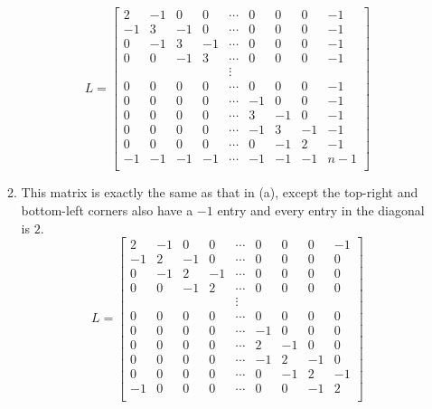 \documentclass[12pt]{article}
\begin{document}
\begin{enumerate}[label=(\alph*)]
\begin{enumerate}[label=(\alph*)]
        \[
          L = \begin{bmatrix}
            2 & -1 & 0 & 0 & \cdots & 0 & 0 & 0 & -1 \\
            -1 & 3 & -1 & 0 & \cdots & 0 & 0 & 0 & -1 \\
            0 & -1 & 3 & -1 & \cdots & 0 & 0 & 0 & -1 \\
            0 & 0 & -1 & 3 & \cdots & 0 & 0 & 0 & -1 \\
              &   &   &   & \vdots &   &   &   &   \\
            0 & 0 & 0 & 0 & \cdots & 0 & 0 & 0 & -1  \\
            0 & 0 & 0 & 0 & \cdots & -1 & 0 & 0 & -1  \\
            0 & 0 & 0 & 0 & \cdots & 3 & -1 & 0 & -1  \\
            0 & 0 & 0 & 0 & \cdots & -1 & 3 & -1 & -1  \\
            0 & 0 & 0 & 0 & \cdots & 0 & -1 & 2 & -1  \\
            -1 & -1 & -1 & -1 & \cdots & -1 & -1 & -1 & n-1  \\
          \end{bmatrix}
        \]
      \item
        This matrix is exactly the same as that in (a), except the top-right and bottom-left corners also have a $-1$ entry and every entry in the diagonal is $2$.
        \[
          L = \begin{bmatrix}
            2 & -1 & 0 & 0 & \cdots & 0 & 0 & 0 & -1 \\
            -1 & 2 & -1 & 0 & \cdots & 0 & 0 & 0 & 0 \\
            0 & -1 & 2 & -1 & \cdots & 0 & 0 & 0 & 0 \\
            0 & 0 & -1 & 2 & \cdots & 0 & 0 & 0 & 0 \\
              &   &   &   & \vdots &   &   &   &   \\
            0 & 0 & 0 & 0 & \cdots & 0 & 0 & 0 & 0  \\
            0 & 0 & 0 & 0 & \cdots & -1 & 0 & 0 & 0  \\
            0 & 0 & 0 & 0 & \cdots & 2 & -1 & 0 & 0  \\
            0 & 0 & 0 & 0 & \cdots & -1 & 2 & -1 & 0  \\
            0 & 0 & 0 & 0 & \cdots & 0 & -1 & 2 & -1  \\
            -1 & 0 & 0 & 0 & \cdots & 0 & 0 & -1 & 2  \\
          \end{bmatrix}
\]
\end{enumerate}
\end{enumerate}
\end{document}
